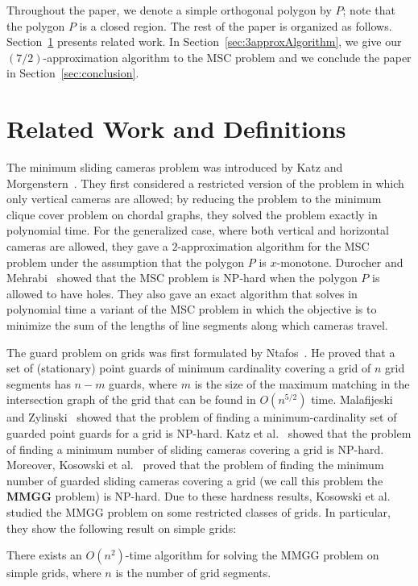 \documentclass{llncs}
\begin{document}
Throughout the paper, we denote a simple orthogonal polygon by $P$; note that the
polygon $P$ is a closed region.
The rest of the paper is organized as follows. Section~\ref{sec:relatedWork} presents
related work. In Section~\ref{sec:3approxAlgorithm}, we give our $(7/2)$-approximation
algorithm to the MSC problem and we conclude the paper in Section~\ref{sec:conclusion}.

\section{Related Work and Definitions}
\label{sec:relatedWork}
The minimum sliding cameras problem was introduced by Katz and Morgenstern~\cite{katz2011}.
They first considered a restricted version of the problem in which only vertical cameras are allowed; by reducing
the problem to the minimum clique cover problem on chordal graphs, they solved the problem exactly
in polynomial time. For the generalized case, where both vertical and horizontal cameras are allowed,
they gave a $2$-approximation algorithm for the MSC problem under the assumption that the polygon $P$
is $x$-monotone. 
Durocher and Mehrabi~\cite{durocher2013} showed that the MSC
problem is \textsc{NP}-hard when the polygon $P$ is allowed to have holes. They also gave an exact algorithm
that solves in polynomial time a variant of the MSC problem in which the objective is to minimize the sum of the lengths of line
segments along which cameras travel.


The guard problem on grids was first formulated by Ntafos~\cite{ntafos1986}.
He proved that a set of (stationary) point guards of minimum cardinality covering a grid of
$n$ grid segments has $n−m$ guards, where $m$ is the size of the maximum
matching in the intersection graph of the grid that can be found in $O(n^{5/2})$
time. Malafijeski and Zylinski~\cite{malafijeski2005} showed that the problem of
finding a minimum-cardinality set of guarded point guards for a grid is \textsc{NP}-hard.
Katz et al.~\cite{katz2005} showed that the problem of finding a minimum number
of sliding cameras covering a grid is \textsc{NP}-hard. Moreover,
Kosowski et al.~\cite{kosowski2004} proved that the problem of finding
the minimum number of guarded sliding cameras covering a grid (we call
this problem the {\bf MMGG} problem) is \textsc{NP}-hard.
Due to these hardness results, Kosowski et al.~\cite{adrian2006} studied
the MMGG problem on some restricted classes of grids. In particular, they show the following result
on simple grids:
\begin{theorem}
\label{thm:nSquarForGridProblem}
There exists an $O(n^2)$-time algorithm for solving the MMGG problem on
simple grids, where $n$ is the number of grid segments.
\end{theorem}
\end{document}
